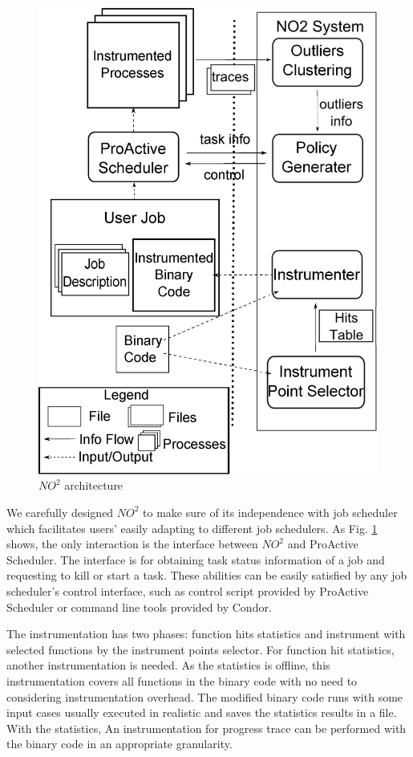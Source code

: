 \begin{figure}
\centering
\includegraphics[width=0.9\columnwidth]{figures/NO2_arch.eps}
\caption{$NO^2$ architecture}
\label{figure:no2arch}
\end{figure}

We carefully designed $NO^2$ to make sure of its independence with job scheduler which facilitates users' easily adapting to different job schedulers. As Fig. \ref{figure:no2arch} shows, the only interaction is the interface between $NO^2$ and ProActive Scheduler. The interface is for obtaining task status information of a job and requesting to kill or start a task. These abilities can be easily satisfied by any job scheduler's control interface, such as control script provided by ProActive Scheduler or command line tools provided by Condor.

The instrumentation has two phases: function hits statistics and instrument with selected functions by the instrument points selector. For function hit statistics, another instrumentation is needed. As the statistics is offline, this instrumentation covers all functions in the binary code with no need to considering instrumentation overhead. The modified binary code runs with some input cases usually executed in realistic and saves the statistics results in a file. With the statistics, An instrumentation for progress trace can be performed with the binary code in an appropriate granularity.

